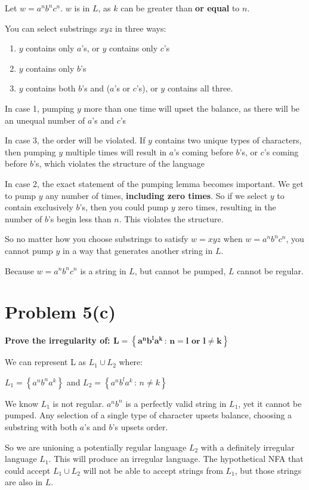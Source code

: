 \documentclass{report}
\begin{document}
Let $w = a^n b^n c^n$. $w$ is in $L$, as $k$ can be greater than \textbf{or equal} to $n$.

You can select substrings $xyz$ in three ways:
\begin{enumerate}
\item $y$ contains only $a$'s, or $y$ contains only $c$'s
\item $y$ contains only $b$'s
\item $y$ contains both $b$'s and ($a$'s or $c$'s), or $y$ contains all three.
\end{enumerate}

In case 1, pumping $y$ more than one time will upset the balance, as there will be an unequal number of $a$'s and $c$'s

In case 3, the order will be violated. If $y$ contains two unique types of characters, then pumping $y$ multiple times will result in $a$'s coming before $b$'s, or $c$'s coming before $b$'s, which violates the structure of the language

In case 2, the exact statement of the pumping lemma becomes important. We get to pump $y$ any number of times, \textbf{including zero times}.
So if we select $y$ to contain exclusively $b$'s, then you could pump $y$ zero times, resulting in the number of $b$'s begin less than $n$.
This violates the structure.

So no matter how you choose substrings to satisfy $w = xyz$ when $w = a^n b^n c^n$, you cannot pump $y$ in a way that generates another string in $L$.

Because $w = a^n b^n c^n$ is a string in $L$, but cannot be pumped, $L$ cannot be regular.


\section*{Problem 5(c)}
\textbf{Prove the irregularity of: $\mathbf{L = \left\{a^n b^l a^k \, : \,  n = l \text{ or } l \neq k \right\}}$}


We can represent L as $L_1 \cup L_2$ where:

$L_1 = \left\{ a^n b^n a^k \right\}$ and $ L_2 = \left\{ a^n b^l a^k \, : \, n \neq k\right\}$

We know $L_1$ is not regular. $a^n b^n$ is a perfectly valid string in $L_1$, yet it cannot be pumped. Any selection of a single type of character upsets balance, choosing a substring with both $a$'s and $b$'s upsets order.

So we are unioning a potentially regular language $L_2$ with a definitely irregular language $L_1$. This will produce an irregular language.
The hypothetical NFA that could accept $L_1 \cup L_2$ will not be able to accept strings from $L_1$, but those strings are also in $L$.
\end{document}
